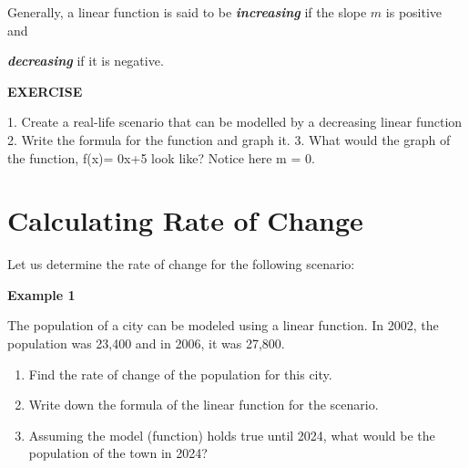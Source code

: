 \documentclass[
  letterpaper,
  DIV=11,
  numbers=noendperiod]{scrreprt}
\newenvironment{Shaded}{\begin{snugshade}}{\end{snugshade}}
\newcommand{\DataTypeTok}[1]{\textcolor[rgb]{0.68,0.00,0.00}{#1}}
\newcommand{\DecValTok}[1]{\textcolor[rgb]{0.68,0.00,0.00}{#1}}
\newcommand{\ErrorTok}[1]{\textcolor[rgb]{0.68,0.00,0.00}{#1}}
\newcommand{\KeywordTok}[1]{\textcolor[rgb]{0.00,0.23,0.31}{#1}}
\newcommand{\OperatorTok}[1]{\textcolor[rgb]{0.37,0.37,0.37}{#1}}
\begin{document}
Generally, a linear function is said to be \textbf{\emph{increasing}} if
the slope \(m\) is positive and

\textbf{\emph{decreasing}} if it is negative.

\textbf{EXERCISE}

\begin{Shaded}
\begin{Highlighting}[]
\DataTypeTok{1}\KeywordTok{.} \DataTypeTok{Create} \DataTypeTok{a} \DataTypeTok{real{-}life} \DataTypeTok{scenario} \DataTypeTok{that} \DataTypeTok{can} \DataTypeTok{be} \DataTypeTok{modelled} \DataTypeTok{by} \DataTypeTok{a} \DataTypeTok{decreasing} \DataTypeTok{linear} \DataTypeTok{function}
\DataTypeTok{2}\KeywordTok{.} \DataTypeTok{Write} \DataTypeTok{the} \DataTypeTok{formula} \DataTypeTok{for} \DataTypeTok{the} \DataTypeTok{function} \DataTypeTok{and} \DataTypeTok{graph} \DataTypeTok{it}\KeywordTok{.}
\DataTypeTok{3}\KeywordTok{.} \DataTypeTok{What} \DataTypeTok{would} \DataTypeTok{the} \DataTypeTok{graph} \DataTypeTok{of} \DataTypeTok{the} \DataTypeTok{function}\ErrorTok{,} \DataTypeTok{f}\ErrorTok{(}\DataTypeTok{x}\ErrorTok{)}\OperatorTok{=} \DecValTok{0}\DataTypeTok{x}\ErrorTok{+}\DataTypeTok{5} \DataTypeTok{look} \DataTypeTok{like}\ErrorTok{?} \DataTypeTok{Notice} \DataTypeTok{here} \DataTypeTok{m} \OperatorTok{=} \DecValTok{0}\KeywordTok{.} 
\end{Highlighting}
\end{Shaded}

\hypertarget{calculating-rate-of-change}{%
\section{Calculating Rate of Change}\label{calculating-rate-of-change}}

Let us determine the rate of change for the following scenario:

\textbf{Example 1}

The population of a city can be modeled using a linear function. In
2002, the population was 23,400 and in 2006, it was 27,800.

\begin{enumerate}
\def\labelenumi{\alph{enumi})}
\item
  Find the rate of change of the population for this city.
\item
  Write down the formula of the linear function for the scenario.
\item
  Assuming the model (function) holds true until 2024, what would be the
  population of the town in 2024?
\end{enumerate}
\end{document}
